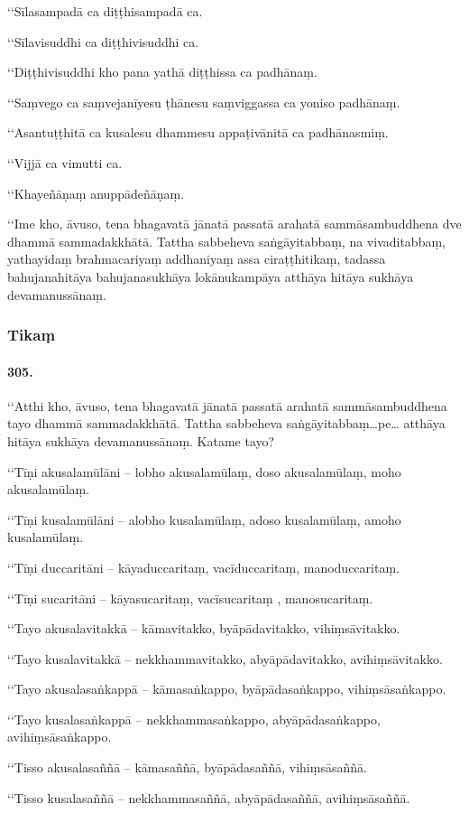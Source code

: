 ‘‘Sīlasampadā ca diṭṭhisampadā ca.

‘‘Sīlavisuddhi ca diṭṭhivisuddhi ca.

‘‘Diṭṭhivisuddhi kho pana yathā diṭṭhissa ca padhānaṃ.

‘‘Saṃvego ca saṃvejanīyesu ṭhānesu saṃviggassa ca yoniso padhānaṃ.

‘‘Asantuṭṭhitā ca kusalesu dhammesu appaṭivānitā ca padhānasmiṃ.

‘‘Vijjā ca vimutti ca.

‘‘Khayeñāṇaṃ anuppādeñāṇaṃ.

‘‘Ime kho, āvuso, tena bhagavatā jānatā passatā arahatā sammāsambuddhena dve dhammā sammadakkhātā. Tattha sabbeheva saṅgāyitabbaṃ, na vivaditabbaṃ, yathayidaṃ brahmacariyaṃ addhaniyaṃ assa ciraṭṭhitikaṃ, tadassa bahujanahitāya bahujanasukhāya lokānukampāya atthāya hitāya sukhāya devamanussānaṃ.

\subsubsection{Tikaṃ}

\paragraph{305.} ‘‘Atthi kho, āvuso, tena bhagavatā jānatā passatā arahatā sammāsambuddhena tayo dhammā sammadakkhātā. Tattha sabbeheva saṅgāyitabbaṃ…pe… atthāya hitāya sukhāya devamanussānaṃ. Katame tayo?

‘‘Tīṇi akusalamūlāni – lobho akusalamūlaṃ, doso akusalamūlaṃ, moho akusalamūlaṃ.

‘‘Tīṇi kusalamūlāni – alobho kusalamūlaṃ, adoso kusalamūlaṃ, amoho kusalamūlaṃ.

‘‘Tīṇi duccaritāni – kāyaduccaritaṃ, vacīduccaritaṃ, manoduccaritaṃ.

‘‘Tīṇi sucaritāni – kāyasucaritaṃ, vacīsucaritaṃ , manosucaritaṃ.

‘‘Tayo akusalavitakkā – kāmavitakko, byāpādavitakko, vihiṃsāvitakko.

‘‘Tayo kusalavitakkā – nekkhammavitakko, abyāpādavitakko, avihiṃsāvitakko.

‘‘Tayo akusalasaṅkappā – kāmasaṅkappo, byāpādasaṅkappo, vihiṃsāsaṅkappo.

‘‘Tayo kusalasaṅkappā – nekkhammasaṅkappo, abyāpādasaṅkappo, avihiṃsāsaṅkappo.

‘‘Tisso akusalasaññā – kāmasaññā, byāpādasaññā, vihiṃsāsaññā.

‘‘Tisso kusalasaññā – nekkhammasaññā, abyāpādasaññā, avihiṃsāsaññā.

